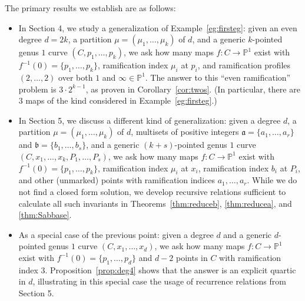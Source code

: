\documentclass[11pt]{article}           %
\renewcommand{\a}{\mathfrak a}
\renewcommand{\b}{\mathfrak b}
\renewcommand{\P}{\mathbb P}
\theoremstyle{definition}
\begin{document}
The primary results we establish are as follows:
\begin{itemize}
\item In Section 4, we study a generalization of Example~\ref{eg:firsteg}: given
  an even degree $d=2k$, a partition $\mu=(\mu_1,\dots,\mu_k)$ of $d$, and a generic
  $k$-pointed genus $1$ curve $(C,p_1,\dots,p_k)$, we ask how many maps
  $f:C\to\P^1$ exist with $f^{-1}(0)=\{p_1,\dots,p_k\}$, ramification index $\mu_i$
  at $p_i$, and ramification profiles $(2,\dots,2)$ over both $1$ and $\infty\in\P^1$.
  The answer to this ``even ramification'' problem is $3\cdot 2^{k-1}$, as
  proven in Corollary~\ref{cor:twos}. (In particular, there are $3$ maps of
  the kind considered in Example~\ref{eg:firsteg}.)
\item In Section 5, we discuss a different kind of generalization: given
  a degree $d$, a partition $\mu=(\mu_1,\dots,\mu_k)$ of $d$, multisets of positive integers $\a=\{a_1,\dots,a_r\}$ and $\b=\{b_1,\dots,b_s\}$,
  and a generic $(k+s)$-pointed genus $1$ curve $(C,x_1,\dots,x_k,P_1,\dots,P_s)$,
  we ask how many maps $f:C\to\P^1$ exist with $f^{-1}(0)=\{p_1,\dots,p_k\}$, ramification
  index $\mu_i$ at $x_i$, ramification index $b_i$ at $P_i$, and other (unmarked) points
  with ramification indices $a_1,\dots,a_r$.
  While we do not find a closed form solution, we develop recursive relations sufficient
  to calculate all such invariants in Theorems~\ref{thm:reduceb}, \ref{thm:reducea}, and \ref{thm:Sabbase}.
\item As a special case of the previous point: given a degree $d$ and a generic $d$-pointed genus $1$ curve $(C,x_1,\dots,x_d)$, we ask
  how many maps $f:C\to\P^1$ exist with $f^{-1}(0)=\{p_1,\dots,p_d\}$ and $d-2$ points in $C$ with ramification index $3$. Proposition~\ref{prop:deg4} shows that the answer is an explicit quartic in $d$, illustrating in this special case the usage of recurrence relations from Section 5.
  
  \end{itemize}
\end{document}
